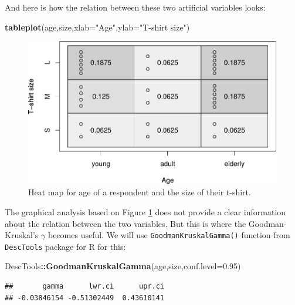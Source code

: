 \documentclass[
]{book}
\newenvironment{Shaded}{\begin{snugshade}}{\end{snugshade}}
\newcommand{\DataTypeTok}[1]{\textcolor[rgb]{0.13,0.29,0.53}{#1}}
\newcommand{\FloatTok}[1]{\textcolor[rgb]{0.00,0.00,0.81}{#1}}
\newcommand{\KeywordTok}[1]{\textcolor[rgb]{0.13,0.29,0.53}{\textbf{#1}}}
\newcommand{\NormalTok}[1]{#1}
\newcommand{\OperatorTok}[1]{\textcolor[rgb]{0.81,0.36,0.00}{\textbf{#1}}}
\newcommand{\StringTok}[1]{\textcolor[rgb]{0.31,0.60,0.02}{#1}}
\theoremstyle{definition}
\theoremstyle{definition}
\theoremstyle{definition}
\theoremstyle{definition}
\theoremstyle{remark}
\begin{document}
And here is how the relation between these two artificial variables looks:

\begin{Shaded}
\begin{Highlighting}[]
\KeywordTok{tableplot}\NormalTok{(age,size,}\DataTypeTok{xlab=}\StringTok{"Age"}\NormalTok{,}\DataTypeTok{ylab=}\StringTok{"T{-}shirt size"}\NormalTok{)}
\end{Highlighting}
\end{Shaded}

\begin{figure}
\centering
\includegraphics{Svetunkov---Statistics-for-Business-Analytics_files/figure-latex/tableplotAgeSize-1.pdf}
\caption{\label{fig:tableplotAgeSize}Heat map for age of a respondent and the size of their t-shirt.}
\end{figure}

The graphical analysis based on Figure \ref{fig:tableplotAgeSize} does not provide a clear information about the relation between the two variables. But this is where the Goodman-Kruskal's \(\gamma\) becomes useful. We will use \texttt{GoodmanKruskalGamma()} function from \texttt{DescTools} package for R for this:

\begin{Shaded}
\begin{Highlighting}[]
\NormalTok{DescTools}\OperatorTok{::}\KeywordTok{GoodmanKruskalGamma}\NormalTok{(age,size,}\DataTypeTok{conf.level=}\FloatTok{0.95}\NormalTok{)}
\end{Highlighting}
\end{Shaded}

\begin{verbatim}
##       gamma      lwr.ci      upr.ci 
## -0.03846154 -0.51302449  0.43610141
\end{verbatim}
\end{document}
